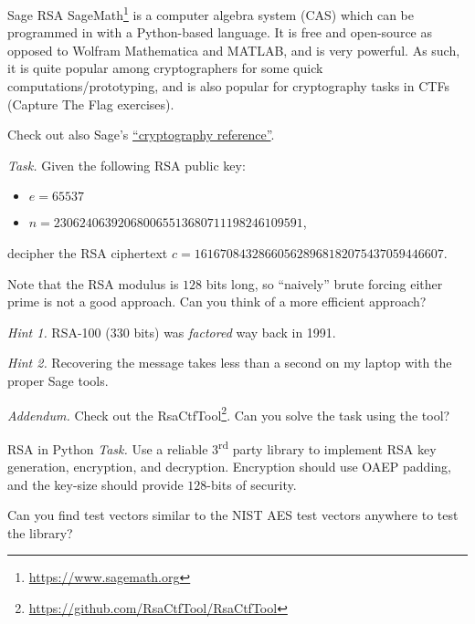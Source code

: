 \documentclass{practice}
\begin{document}
\newpage

\begin{task}{Sage RSA}
  SageMath\footnote{\url{https://www.sagemath.org}} is a computer algebra system (CAS) which can be programmed in with a Python-based language.
  It is free and open-source as opposed to Wolfram Mathematica and MATLAB, and is very powerful.
  As such, it is quite popular among cryptographers for some quick computations/prototyping, and is also popular for cryptography tasks in CTFs (Capture The Flag exercises).

  Check out also Sage's \href{https://doc.sagemath.org/html/en/reference/cryptography/index.html}{\enquote{cryptography reference}}.

  \textit{Task.}
  Given the following RSA public key:
  \begin{itemize}
    \item $e = 65537$
    \item $n = 230624063920680065513680711198246109591$,
  \end{itemize}
  decipher the RSA ciphertext $c = 161670843286605628968182075437059446607$.

  Note that the RSA modulus is $128$ bits long, so \enquote{naively} brute forcing either prime is not a good approach.
  Can you think of a more efficient approach?
  
  \textit{Hint 1.}
  RSA-100 ($330$ bits) was \emph{factored} way back in 1991.

  \textit{Hint 2.}
  Recovering the message takes less than a second on my laptop with the proper Sage tools.

  \textit{Addendum.}
  Check out the RsaCtfTool\footnote{\url{https://github.com/RsaCtfTool/RsaCtfTool}}.
  Can you solve the task using the tool?
\end{task}

\begin{task}{RSA in Python}
  \textit{Task.}
  Use a reliable 3\textsuperscript{rd} party library to implement RSA key generation, encryption, and decryption.
  Encryption should use OAEP padding, and the key-size should provide $128$-bits of security.

  Can you find test vectors similar to the NIST AES test vectors anywhere to test the library?
\end{task}
\end{document}
